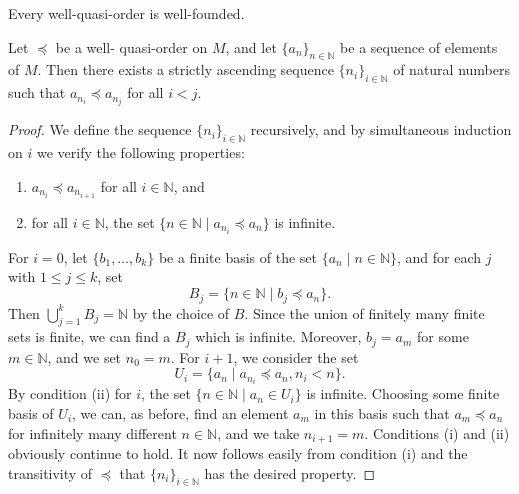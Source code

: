 \begin{corollary}\label{cor:wqo_is_wellFounded} %
    Every well-quasi-order is well-founded.
\end{corollary}
    
\begin{proposition}\label{prop:wqoAscendingSubsequence} %
    \mathlibok
    Let $\preceq$ be a well- quasi-order on $M$, and let $\{a_n\}_{n \in \mathbb{N}}$ be a sequence of elements of $M$.
    Then there exists a strictly ascending sequence $\{n_i\}_{i \in \mathbb{N}}$ of natural numbers such that $a_{n_i} \preceq a_{n_j}$ for all $i < j$.
\end{proposition}
\begin{proof}
  We define the sequence $\{n_i\}_{i \in \mathbb{N}}$ recursively, and by simultaneous induction on $i$ we verify the following properties:
  \begin{enumerate}
      \item $a_{n_i} \preceq a_{n_{i+1}}$ for all $i \in \mathbb{N}$, and
      \item for all $i \in \mathbb{N}$, the set $\{n \in \mathbb{N} \mid a_{n_i} \preceq a_n\}$ is infinite.
  \end{enumerate}
  For $i=0$, let $\{b_1, \dots, b_k\}$ be a finite basis of the set $\{a_n \mid n \in \mathbb{N}\}$, and for each $j$ with $1 \le j \le k$, set
  \[
  B_j = \{n \in \mathbb{N} \mid b_j \preceq a_n\}.
  \]
  Then $\bigcup_{j=1}^k B_j = \mathbb{N}$ by the choice of $B$. 
  Since the union of finitely many finite sets is finite, we can find a $B_j$ which is infinite. 
  Moreover, $b_j = a_m$ for some $m \in \mathbb{N}$, and we set $n_0 = m$. 
  For $i+1$, we consider the set
  \[
  U_i = \{a_n \mid a_{n_i} \preceq a_n, n_i < n\}.
  \]
  By condition (ii) for $i$, the set $\{n \in \mathbb{N} \mid a_n \in U_i\}$ is infinite. 
  Choosing some finite basis of $U_i$, we can, as before, find an element $a_m$ in this basis such that $a_m \preceq a_n$ for infinitely many different $n \in \mathbb{N}$, and we take $n_{i+1} = m$. 
  Conditions (i) and (ii) obviously continue to hold. 
  It now follows easily from condition (i) and the transitivity of $\preceq$ that $\{n_i\}_{i \in \mathbb{N}}$ has the desired property.
\end{proof}

